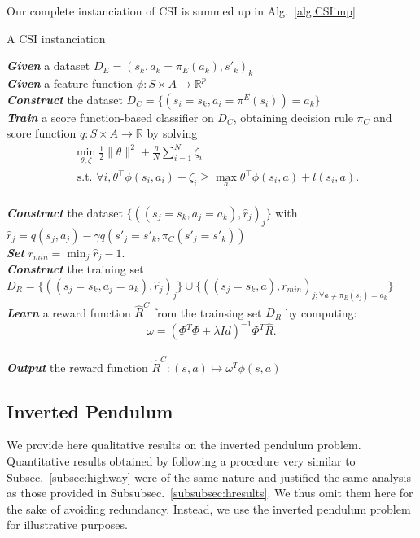 \documentclass[smallextended]{svjour3}
\begin{document}
Our complete instanciation of CSI is summed up in Alg.~\ref{alg:CSIimp}.
\begin{algorithm}%
  \caption{A CSI instanciation}
  \label{alg:CSIimp}
  \emph{\textbf{Given}} a dataset  $D_E = (s_k,a_k=\pi_E(a_k),s'_k)_k$\;\\
  \emph{\textbf{Given}} a feature function $\phi: S\times A \rightarrow \mathbb{R}^p$\;\\
  \emph{\textbf{Construct}} the dataset $D_C=\{(s_i=s_k,a_i=\pi^E(s_i))=a_k\}$ \;\\
  \emph{\textbf{Train}} a score function-based classifier on $D_C$, obtaining decision rule $\pi_C$ and score function $q:S\times A \rightarrow \mathbb R$ by solving \begin{eqnarray*}
  &\min_{\theta,\zeta}\frac{1}{2}\|\theta\|^2 +
  \frac{\eta}{N}\sum_{i=1}^N \zeta_i \\
  &\text{~s.t.~} \forall i,
  \theta^\top{\phi}(s_i,a_i)+\zeta_i \geq \max_a \theta^\top
  {\phi}(s_i,a) + l(s_i,a). \label{eq:qp_taskar}
\end{eqnarray*}\;\\
\emph{\textbf{Construct}} the dataset $\{((s_{j}=s_k,a_{j}=a_k),\hat r_j)_j\}$ with $\hat r_j = q(s_j,a_j) - \gamma q(s'_j=s'_k,\pi_C(s'_j=s'_k))$\;\\
\emph{\textbf{Set}} $r_{min} = \min_j\hat r_j - 1.$\;\\
\emph{\textbf{Construct}} the training set  $D_R = \{((s_{j}=s_k,a_{j}=a_k),\hat r_j)_j\}\cup\{((s_j=s_k,a),r_{min})_{j;\forall a\neq \pi_E(s_j) = a_k}\}$ \;\\
\emph{\textbf{Learn}} a reward function $\hat R^C$ from the trainsing set $D_R$ by computing:
\begin{equation*}
  \omega = (\Phi^T\Phi + \lambda Id)^{-1}\Phi^T\hat R.
\end{equation*}\;\\
\emph{\textbf{Output}} the reward function $\hat R^{C}: (s,a) \mapsto \omega^T \phi(s,a)$ \;
\end{algorithm}

\subsection{Inverted Pendulum}
\label{subsec:IP}
We provide here qualitative results on the inverted pendulum problem. Quantitative results obtained by following a procedure very similar to Subsec.~\ref{subsec:highway} were of the same nature and justified the same analysis as those provided in Subsubsec.~\ref{subsubsec:hresults}. We thus omit them here for the sake of avoiding redundancy. Instead, we use the inverted pendulum problem for illustrative purposes.
\end{document}
